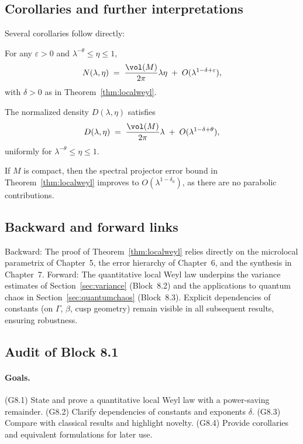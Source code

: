 \subsection{Corollaries and further interpretations}
Several corollaries follow directly:
\begin{corollary}\label{cor:localweyl-sharp}
For any $\varepsilon>0$ and $\lambda^{-\theta}\le \eta\le 1$,
\[
N(\lambda,\eta)\;=\;\frac{\vol(M)}{2\pi}\lambda\eta\;+\;O(\lambda^{1-\delta+\varepsilon}),
\]
with $\delta>0$ as in Theorem~\ref{thm:localweyl}.
\end{corollary}
\begin{corollary}\label{cor:localweyl-density}
The normalized density $D(\lambda,\eta)$ satisfies
\[
D(\lambda,\eta)\;=\;\frac{\vol(M)}{2\pi}\lambda\;+\;O(\lambda^{1-\delta+\theta}),
\]
uniformly for $\lambda^{-\theta}\le \eta\le 1$.
\end{corollary}
\begin{corollary}\label{cor:localweyl-compact}
If $M$ is compact, then the spectral projector error bound in Theorem~\ref{thm:localweyl} improves to $O(\lambda^{1-\delta_0})$, as there are no parabolic contributions.
\end{corollary}

\subsection{Backward and forward links}
Backward: The proof of Theorem~\ref{thm:localweyl} relies directly on the microlocal parametrix of Chapter~5, the error hierarchy of Chapter~6, and the synthesis in Chapter~7. Forward: The quantitative local Weyl law underpins the variance estimates of Section~\ref{sec:variance} (Block~8.2) and the applications to quantum chaos in Section~\ref{sec:quantumchaos} (Block~8.3). Explicit dependencies of constants (on $\Gamma$, $\beta$, cusp geometry) remain visible in all subsequent results, ensuring robustness.

\subsection{Audit of Block 8.1}
\paragraph{Goals.} 
(G8.1) State and prove a quantitative local Weyl law with a power-saving remainder.  
(G8.2) Clarify dependencies of constants and exponents $\delta$.  
(G8.3) Compare with classical results and highlight novelty.  
(G8.4) Provide corollaries and equivalent formulations for later use.

